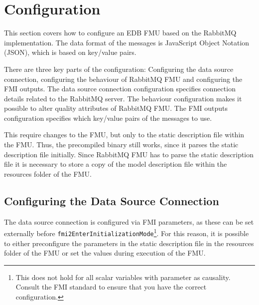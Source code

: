 \section{Configuration}\label{sec:configuration}
This section covers how to configure an EDB FMU based on the RabbitMQ
implementation.
The data format of the messages is JavaScript Object Notation (JSON), which is
based on key/value pairs.

There are three key parts of the configuration: Configuring the data source connection,
configuring the behaviour of RabbitMQ FMU and
configuring the FMI outputs. The data source connection configuration specifies connection
details related to the RabbitMQ server. The behaviour configuration makes it
possible to alter quality attributes of RabbitMQ FMU. The FMI outputs configuration specifies which key/value pairs of the messages to
use.

This require changes to the FMU, but only to the static description file within
the FMU. Thus, the precompiled binary still works, since it parses the static
description file initially. Since RabbitMQ FMU has to parse the static
description file it is necessary to store a copy of the model description file
within the resources folder of the FMU.

\subsection{Configuring the Data Source Connection}
The data source connection is configured via FMI parameters, as these can be set externally
before \texttt{fmi2EnterInitializationMode}\footnote{This does not hold for all
  scalar variables with parameter as causality. Consult the FMI standard to ensure that you have the correct configuration.}. For this reason, it is possible to
either preconfigure the parameters in the static description file in the
resources folder of the FMU or set the values during execution of the FMU.

